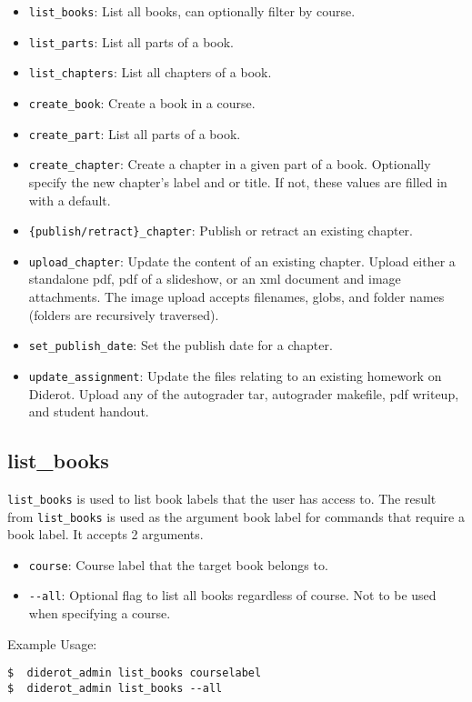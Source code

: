 \begin{itemize}
  \item \verb|list_books|: List all books, can optionally filter by course.
  \item \verb|list_parts|: List all parts of a book.
  \item \verb|list_chapters|: List all chapters of a book.
  \item \verb|create_book|: Create a book in a course.
  \item \verb|create_part|: List all parts of a book.
  \item \verb|create_chapter|: Create a chapter in a given part of a
    book. Optionally specify the new chapter's label and or title. If
    not, these values are filled in with a default.
  \item \verb|{publish/retract}_chapter|: Publish or retract an existing chapter.
  \item \verb|upload_chapter|: Update the content of an existing
    chapter. Upload either a standalone pdf, pdf of a slideshow, or an
    xml document and image attachments.  The image upload accepts
    filenames, globs, and folder names (folders are recursively
    traversed).
  \item \verb|set_publish_date|: Set the publish date for a chapter.
  \item \verb|update_assignment|: Update the files relating to an existing homework on Diderot.  Upload any of the autograder tar, autograder makefile, pdf writeup, and student handout.
\end{itemize}

\subsection{list\_books}

\verb|list_books| is used to list book labels that the user has access to.
%
The result from \verb|list_books| is used as the argument book label for commands
that require a book label.
%
It accepts 2 arguments.

\begin{itemize}
  \item \verb|course|: Course label that the target book belongs to.
  \item \verb|--all|: Optional flag to list all books regardless of course. Not to be used when specifying a course.
\end{itemize}

Example Usage:
\begin{verbatim}
$  diderot_admin list_books courselabel
$  diderot_admin list_books --all
\end{verbatim}

